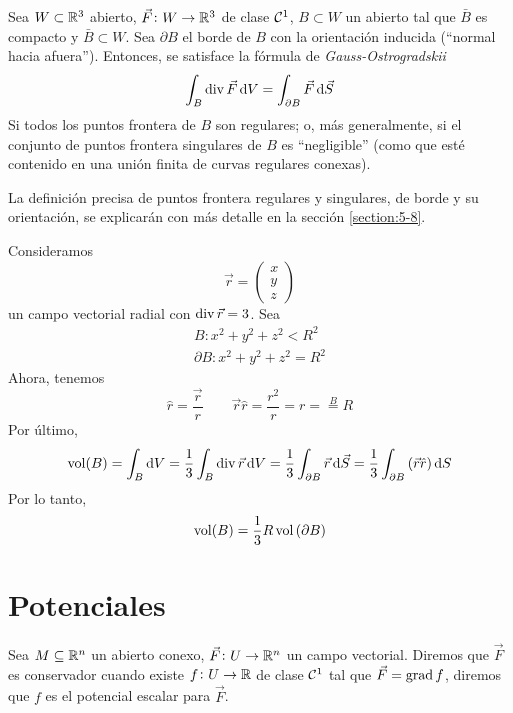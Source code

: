 \begin{teo}
    Sea $W \subset \mathbb{R}^3$ abierto, $\vec{F} \colon W \to \mathbb{R}^3$ de clase $\mathcal{C}^1$, $B \subset W$ un abierto tal que $\bar{B}$ es compacto y $\bar{B} \subset W$.
    Sea $\partial B$ el borde de $B$ con la orientación inducida (``normal hacia afuera''). Entonces, se satisface la fórmula de \emph{Gauss-Ostrogradskii}
    \[
        \int_B \diver \vec{F} \dif V = \int_{\partial B} \vec{F} \dif \vec{S}
    \]
    Si todos los puntos frontera de $B$ son regulares; o, más generalmente, si el conjunto de puntos frontera singulares de $B$ es ``negligible'' (como que est\'e 
    contenido en una unión finita de curvas regulares conexas).
\end{teo}

\begin{obs}
    La definición precisa de puntos frontera regulares y singulares, de borde y su orientación, se explicarán con más detalle en la sección \ref{section:5-8}.
\end{obs}

\begin{example*}
    Consideramos
    \[
        \vec{r} =
        \begin{pmatrix}
            x \\ y \\ z
        \end{pmatrix}
    \]
    un campo vectorial radial con $\operatorname{div} \vec{r} = 3$. Sea
    \begin{gather*}
        B : x^2  + y^2 + z^2 < R^2 \\
        \partial B : x^2 + y^2 + z^2 = R^2
    \end{gather*}
    Ahora, tenemos
    \[
        \hat{r} = \frac{\vec{r}}{r} \qquad
        \vec{r} \hat{r} = \frac{r^2}{r} = r = \stackrel{B}{=} R
    \]
    Por último,
    \[
        \vol(B) = \int_B \dif V = \frac{1}{3} \int_B \diver \vec{r} \dif V = \frac{1}{3} \int_{\partial B} \vec{r} \dif \vec{S}
        = \frac{1}{3} \int_{\partial B} \left( \vec{r} \hat{r} \right) \dif S
    \]
    Por lo tanto,
    \[
        \operatorname{vol}(B) = \frac{1}{3} R \operatorname{vol}\left( \partial B \right)
    \]
\end{example*}

\section{Potenciales}

\begin{defi}
    Sea $M \subseteq \mathbb{R}^n$ un abierto conexo, $\vec{F} \colon U \to \mathbb{R}^n$ un campo vectorial. Diremos que $\vec{F}$ es conservador
    cuando existe $f \colon U \to \mathbb{R}$ de clase $\mathcal{C}^1$ tal que $\vec{F} = \operatorname{grad} f$, diremos que $f$ es el potencial escalar para $\vec{F}$.
\end{defi}

